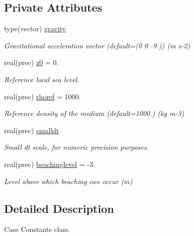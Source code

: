 \subsection*{Private Attributes}
\begin{DoxyCompactItemize}
\item 
type(vector) \mbox{\hyperlink{structsimulationglobals__mod_1_1constants__t_abe210fea4268af42f1cb950a1e3b3cfd}{gravity}}
\begin{DoxyCompactList}\small\item\em Gravitational acceleration vector (default=(0 0 -\/9.)) (m s-\/2) \end{DoxyCompactList}\item 
real(prec) \mbox{\hyperlink{structsimulationglobals__mod_1_1constants__t_a9dab4143c1d5fd54c8337d78ea9b7d82}{z0}} = 0.
\begin{DoxyCompactList}\small\item\em Reference local sea level. \end{DoxyCompactList}\item 
real(prec) \mbox{\hyperlink{structsimulationglobals__mod_1_1constants__t_ac95f74b07cc46e86d443d4dd666235c3}{rhoref}} = 1000.
\begin{DoxyCompactList}\small\item\em Reference density of the medium (default=1000.) (kg m-\/3) \end{DoxyCompactList}\item 
real(prec) \mbox{\hyperlink{structsimulationglobals__mod_1_1constants__t_a4e417855b60f5eb0f45d3094495f532b}{smalldt}}
\begin{DoxyCompactList}\small\item\em Small dt scale, for numeric precision purposes. \end{DoxyCompactList}\item 
real(prec) \mbox{\hyperlink{structsimulationglobals__mod_1_1constants__t_a735a778cb615271495fe8d5dc2b964b7}{beachinglevel}} = -\/3.
\begin{DoxyCompactList}\small\item\em Level above which beaching can occur (m) \end{DoxyCompactList}\end{DoxyCompactItemize}


\subsection{Detailed Description}
Case Constants class. 

